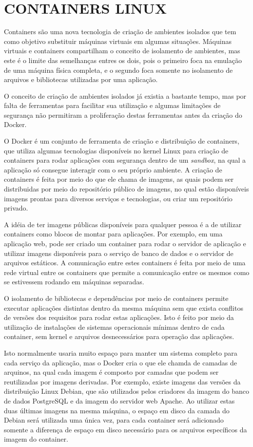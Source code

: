 \section{CONTAINERS LINUX}

Containers são uma nova tecnologia de criação de ambientes isolados que tem
como objetivo substituir máquinas virtuais em algumas situações. Máquinas
virtuais e containers compartilham o conceito de isolamento de ambientes, mas
este é o limite das semelhanças entres os dois, pois o primeiro foca na
emulação de uma máquina física completa, e o segundo foca somente no
isolamento de arquivos e bibliotecas utilizadas por uma aplicação.

O conceito de criação de ambientes isolados já existia a bastante tempo, mas
por falta de ferramentas para facilitar sua utilização e algumas limitações
de segurança não permitiram a proliferação destas ferramentas antes da criação
do Docker.

O Docker é um conjunto de ferramenta de criação e distribuição de containers,
que utiliza algumas tecnologias disponíveis no kernel Linux para criação de
containers para rodar aplicações com segurança dentro de um \emph{sandbox},
na qual a aplicação só consegue interagir com o seu próprio ambiente. A criação
de containers é feita por meio do que ele chama de imagens, as quais podem ser
distribuidas por meio do repositório público de imagens, no qual estão
disponíveis imagens prontas para diversos serviços e tecnologias, ou criar
um repositório privado.

A idéia de ter imagens públicas disponíveis para qualquer pessoa é a de
utilizar containers como blocos de montar para aplicações. Por exemplo,
em uma aplicação web, pode ser criado um container para rodar o servidor de
aplicação e utilizar imagens disponíveis para o serviço de banco de dados e
o servidor de arquivos estáticos. A comunicação entre estes containers é feita
por meio de uma rede virtual entre os containers que permite a comunicação
entre os mesmos como se estivessem rodando em máquinas separadas.

O isolamento de bibliotecas e dependências por meio de containers permite
executar aplicações distintas dentro da mesma máquina sem que exista
conflitos de versões dos requisitos para rodar estas aplicações. Isto é feito
por meio da utilização de instalações de sistemas operacionais mínimas dentro
de cada container, sem kernel e arquivos desnecessários para operação das
aplicações.

Isto normalmente usaria muito espaço para manter um sistema completo para
cada serviço da aplicação, mas o Docker cria o que ele chamda de camadas
de arquinos, na qual cada imagem é composto por camadas que podem ser
reutilizadas por imagens derivadas. Por exemplo, existe imagens das
versões da distribuição Linux Debian, que são utilizados pelos criadores da
imagem do banco de dados PostgreSQL e da imagem do servidor web Apache.
Ao utilizar estas duas últimas imagens na mesma máquina, o espaço em disco
da camada do Debian será utilizada uma única vez, para cada container será
adicionado somente a diferença de espaço em disco necessário para os arquivos
específicos da imagem do container.

